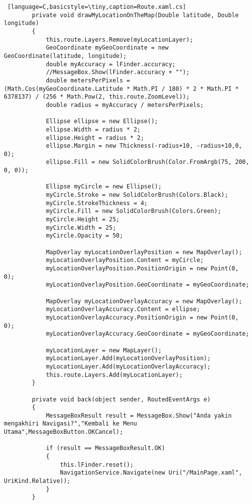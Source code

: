 \begin{lstlisting} [language=C,basicstyle=\tiny,caption=Route.xaml.cs]
        private void drawMyLocationOnTheMap(Double latitude, Double longitude)
        {
            this.route.Layers.Remove(myLocationLayer);
            GeoCoordinate myGeoCoordinate = new GeoCoordinate(latitude, longitude);
            double myAccuracy = lFinder.accuracy; 
            //MessageBox.Show(lFinder.accuracy + "");
            double metersPerPixels = (Math.Cos(myGeoCoordinate.Latitude * Math.PI / 180) * 2 * Math.PI * 6378137) / (256 * Math.Pow(2, this.route.ZoomLevel));
            double radius = myAccuracy / metersPerPixels;

            Ellipse ellipse = new Ellipse();
            ellipse.Width = radius * 2;
            ellipse.Height = radius * 2;
            ellipse.Margin = new Thickness(-radius+10, -radius+10,0, 0);
            ellipse.Fill = new SolidColorBrush(Color.FromArgb(75, 200, 0, 0));

            Ellipse myCircle = new Ellipse();
            myCircle.Stroke = new SolidColorBrush(Colors.Black);
            myCircle.StrokeThickness = 4;
            myCircle.Fill = new SolidColorBrush(Colors.Green);
            myCircle.Height = 25;
            myCircle.Width = 25;
            myCircle.Opacity = 50;

            MapOverlay myLocationOverlayPosition = new MapOverlay();
            myLocationOverlayPosition.Content = myCircle;
            myLocationOverlayPosition.PositionOrigin = new Point(0, 0);
            myLocationOverlayPosition.GeoCoordinate = myGeoCoordinate;

            MapOverlay myLocationOverlayAccuracy = new MapOverlay();
            myLocationOverlayAccuracy.Content = ellipse;
            myLocationOverlayAccuracy.PositionOrigin = new Point(0, 0);
            myLocationOverlayAccuracy.GeoCoordinate = myGeoCoordinate;

            myLocationLayer = new MapLayer();
            myLocationLayer.Add(myLocationOverlayPosition);
            myLocationLayer.Add(myLocationOverlayAccuracy);
            this.route.Layers.Add(myLocationLayer);
        }

        private void back(object sender, RoutedEventArgs e)
        {
            MessageBoxResult result = MessageBox.Show("Anda yakin mengakhiri Navigasi?","Kembali ke Menu Utama",MessageBoxButton.OKCancel);

            if (result == MessageBoxResult.OK)
            {
                this.lFinder.reset();
                NavigationService.Navigate(new Uri("/MainPage.xaml", UriKind.Relative));
            }
        }


\end{lstlisting}
